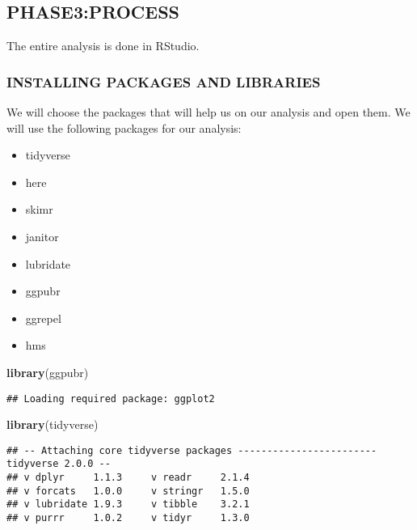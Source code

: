 \documentclass[
]{article}
\newenvironment{Shaded}{\begin{snugshade}}{\end{snugshade}}
\newcommand{\FunctionTok}[1]{\textcolor[rgb]{0.13,0.29,0.53}{\textbf{#1}}}
\newcommand{\NormalTok}[1]{#1}
\providecommand{\tightlist}{%
  \setlength{\itemsep}{0pt}\setlength{\parskip}{0pt}}
\begin{document}
\hypertarget{phase3process}{%
\subsection{PHASE3:PROCESS}\label{phase3process}}

The entire analysis is done in RStudio.

\hypertarget{installing-packages-and-libraries}{%
\subsubsection{INSTALLING PACKAGES AND
LIBRARIES}\label{installing-packages-and-libraries}}

We will choose the packages that will help us on our analysis and open
them. We will use the following packages for our analysis:

\begin{itemize}
\tightlist
\item
  tidyverse
\item
  here
\item
  skimr
\item
  janitor
\item
  lubridate
\item
  ggpubr
\item
  ggrepel
\item
  hms
\end{itemize}

\begin{Shaded}
\begin{Highlighting}[]
\FunctionTok{library}\NormalTok{(ggpubr)}
\end{Highlighting}
\end{Shaded}

\begin{verbatim}
## Loading required package: ggplot2
\end{verbatim}

\begin{Shaded}
\begin{Highlighting}[]
\FunctionTok{library}\NormalTok{(tidyverse)}
\end{Highlighting}
\end{Shaded}

\begin{verbatim}
## -- Attaching core tidyverse packages ------------------------ tidyverse 2.0.0 --
## v dplyr     1.1.3     v readr     2.1.4
## v forcats   1.0.0     v stringr   1.5.0
## v lubridate 1.9.3     v tibble    3.2.1
## v purrr     1.0.2     v tidyr     1.3.0
\end{verbatim}
\end{document}
